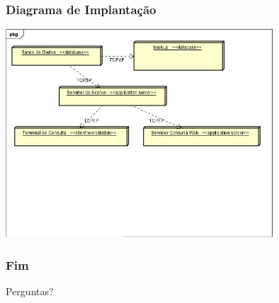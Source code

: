 \documentclass{beamer}
\begin{document}
  \begin{frame}

  \frametitle{Diagrama de Implantação}

  \centering
  \includegraphics[width = 10cm]{Diagramas_de_Implantacao.png}
   
  \end{frame} 
 
\begin{frame}

\frametitle{Fim}

Perguntas?

\end{frame}
\end{document}
